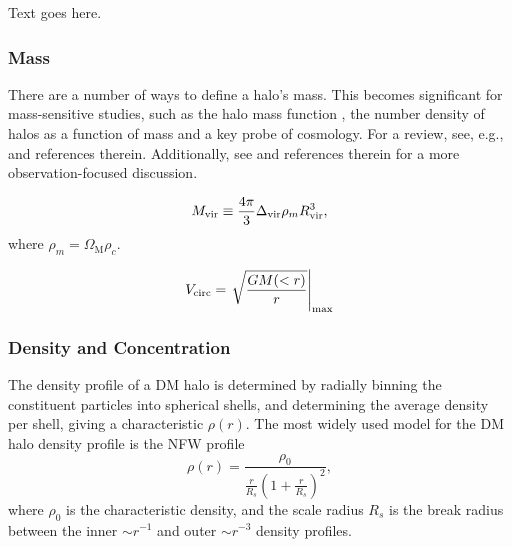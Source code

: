 Text goes here.



\subsubsection{Mass}
\label{subsubsec:early_universe--halo_properties--mass}


There are a number of ways to define a halo's mass.  This becomes significant for mass-sensitive studies, such as the halo mass function \citep{1974ApJ...187..425P, 2007MNRAS.374....2R, 2006ApJ...642L..85H, 2007ApJ...671.1160L}, the number density of halos as a function of mass and a key probe of cosmology.  For a review, see, e.g., \citet{2001A&A...367...27W} and references therein.  Additionally, see \citet{2005RvMP...77..207V} and references therein for a more observation-focused discussion.

\begin{equation}
	{M_{\mathrm{vir}}} \equiv \frac{4 \pi}{3} \Delta_{{\mathrm{vir}}} \rho_{m} R^{3}_{{\mathrm{vir}}},
\end{equation}
where $\rho_{m} = \Omega_{\mathrm{M}} \rho_{c}$.

\begin{equation}
	{V_{\mathrm{circ}}} = \left. \sqrt{\frac{GM(<r)}{r}} \right|_{\mathrm{\max}}
\end{equation}



\subsubsection{Density and Concentration}
\label{subsubsec:early_universe--halo_properties--density}


The density profile of a DM halo is determined by radially binning the constituent particles into spherical shells, and determining the average density per shell, giving a characteristic $\rho(r)$.  The most widely used model for the DM halo density profile is the NFW \citep{1996ApJ...462..563N} profile
\begin{equation} \label{eq:nfw_profile}
	\rho(r) = \frac{ \rho_{0} }{ \frac{ r }{ R_{s}} \left( 1 + \frac{r}{R_{s}} \right)^{2} },
\end{equation}
where $\rho_{0}$ is the characteristic density, and the scale radius $R_{s}$ is the break radius between the inner $\sim r^{-1}$ and outer $\sim r^{-3}$ density profiles.

